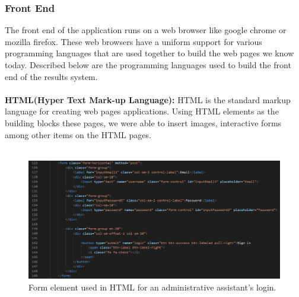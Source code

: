 \subsubsection{Front End}
The front end of the application runs on a web browser like google chrome or mozilla firefox. These web browsers have a uniform support for various programming languages that are used together to build the web pages we know today. Described below are the programming languages used to build the front end of the results system.\\\\
\textbf{HTML(Hyper Text Mark-up Language):} HTML is the standard markup language for creating web pages applications. Using HTML elements as the building blocks these pages, we were able to insert images, interactive forms among other items on the HTML pages.\\\\
\begin{figure}[H]
\includegraphics[scale=0.4]{images/form_snippet.png}
\caption{Form element used in HTML for an administrative assistant's login.}
\end{figure}

